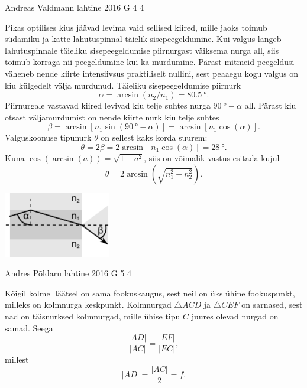 \documentclass[11pt, twoside]{article}
\begin{document}
{%
{Andreas Valdmann} %
{lahtine} %
{2016} %
{G 4} %
{4} %
{

\ifSolution
Pikas optilises kius jäävad levima vaid sellised kiired, mille jaoks toimub südamiku ja katte lahutuspinnal täielik sisepeegeldumine. Kui valgus langeb lahutuspinnale täieliku sisepeegeldumise piirnurgast väiksema nurga all, siis toimub korraga nii peegeldumine kui ka murdumine. Pärast mitmeid peegeldusi väheneb nende kiirte intensiivsus praktiliselt nullini, sest peaaegu kogu valgus on kiu külgedelt välja murdunud. Täieliku sisepeegeldumise piirnurk 
\[
\alpha=\arcsin(n_2/n_1)=\SI{80,5}{\degree}.
\]
Piirnurgale vastavad kiired levivad kiu telje suhtes nurga $\SI{90}{\degree}-\alpha$ all. Pärast kiu otsast väljamurdumist on nende kiirte nurk kiu telje suhtes 
\[
\beta=\arcsin[n_1\sin(\SI{90}{\degree}-\alpha)]=\arcsin[n_1\cos(\alpha)].
\]
Valguskoonuse tipunurk $\theta$ on sellest kaks korda suurem: 
\[
\theta=2\beta=2\arcsin[n_1\cos(\alpha)]=\SI{28}{\degree}.
\]
Kuna $\cos(\arcsin(a))=\sqrt{1-a^2}$, siis on võimalik vastus esitada kujul 
\[
\theta=2\arcsin(\sqrt{n_1^2-n_2^2}).
\]

\begin{center}
 \includegraphics[width=0.35\textwidth]{2016-lahg-04-kiud}
\end{center}
\fi
}

{Andres Põldaru} %
{lahtine} %
{2016} %
{G 5} %
{4} %
{

\ifSolution
Kõigil kolmel läätsel on sama fookuskaugus, sest neil on üks ühine fookuspunkt, milleks on kolmnurga keskpunkt. Kolmnurgad $\triangle ACD$ ja $\triangle CEF$ on sarnased, sest nad on täisnurksed kolmnurgad, mille ühise tipu $C$ juures olevad nurgad on samad. Seega 
\[
\frac{|AD|}{|AC|}=\frac{|EF|}{|EC|},
\]
millest
\[
|AD| = \frac{|AC|}{2} = f.
\]

}}
\end{document}
